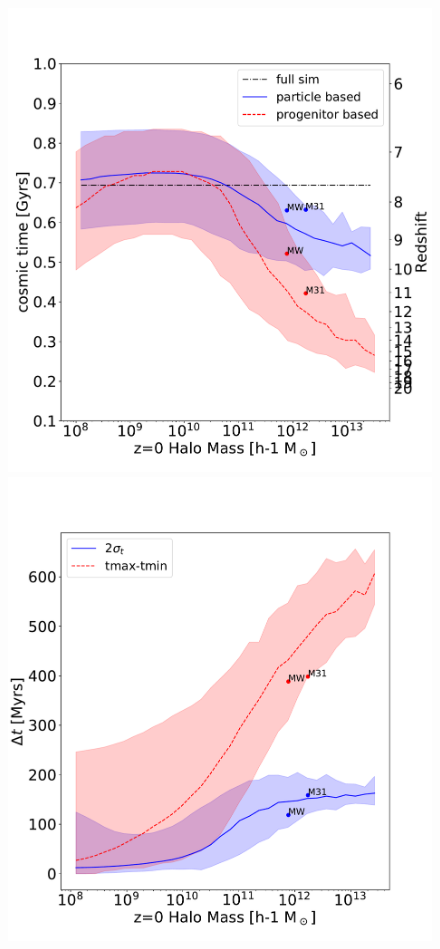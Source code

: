 \documentclass[twocolumn]{aastex61}
\begin{document}
\begin{figure}[ht]
\includegraphics[width=0.94\columnwidth]{img/track_treion_LG_final.pdf}
\includegraphics[width=0.94\columnwidth]{img/track_dt_2sig_LG_final.pdf}

\end{figure}
\end{document}
